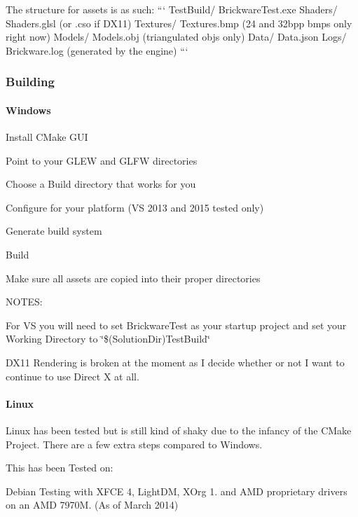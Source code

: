 The structure for assets is as such\+: ``` Test\+Build/ Brickware\+Test.\+exe Shaders/ Shaders.\+glsl (or .cso if D\+X11) Textures/ Textures.\+bmp (24 and 32bpp bmps only right now) Models/ Models.\+obj (triangulated objs only) Data/ Data.\+json Logs/ Brickware.\+log (generated by the engine) ```

\subsubsection*{Building}

\paragraph*{Windows}


\begin{DoxyItemize}
\item Install C\+Make G\+U\+I
\item Point to your G\+L\+E\+W and G\+L\+F\+W directories
\item Choose a Build directory that works for you
\item Configure for your platform (V\+S 2013 and 2015 tested only)
\item Generate build system
\item Build
\item Make sure all assets are copied into their proper directories
\end{DoxyItemize}

N\+O\+T\+E\+S\+:
\begin{DoxyItemize}
\item For V\+S you will need to set Brickware\+Test as your startup project and set your Working Directory to \char`\"{}\$(\+Solution\+Dir)\+Test\+Build\char`\"{}
\item D\+X11 Rendering is broken at the moment as I decide whether or not I want to continue to use Direct X at all.
\end{DoxyItemize}

\paragraph*{Linux}

Linux has been tested but is still kind of shaky due to the infancy of the C\+Make Project. There are a few extra steps compared to Windows.

This has been Tested on\+:

Debian Testing with X\+F\+C\+E 4, Light\+D\+M, X\+Org 1. and A\+M\+D proprietary drivers on an A\+M\+D 7970\+M. (As of March 2014)

